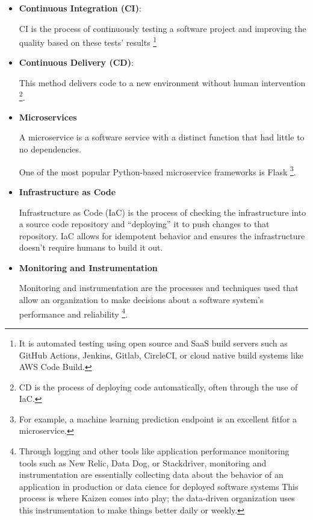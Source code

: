 \begin{itemize}
    \item \textbf{Continuous Integration (CI)}:
    
    \noindent 
    CI is the process of continuously testing a software project and improving the
    quality based on these tests' results
    \footnote{
        It is automated testing using open source and SaaS build
        servers such as GitHub Actions, Jenkins, Gitlab, CircleCI,
        or cloud native build systems like AWS Code Build.
    }


    \item \textbf{Continuous Delivery (CD)}:
    
    \noindent 
    This method delivers code to a new environment without human
    intervention
    \footnote{
        CD is the process of deploying code automatically, often
        through the use of IaC.
    }.
    

    \item \textbf{Microservices}

    \noindent
    A microservice is a software service with a distinct function
    that had little to no dependencies.

    One of the most popular Python-based microservice frameworks is
    Flask
    \footnote{
        For example, a machine learning prediction endpoint is
        an excellent fitfor a microservice.
    }.


    \item \textbf{Infrastructure as Code}
    
    \noindent
    Infrastructure as Code (IaC) is the process of checking the
    infrastructure into a source code repository and “deploying”
    it to push changes to that repository. IaC allows for
    idempotent behavior and ensures the infrastructure doesn't
    require humans to build it out.


    \item \textbf{Monitoring and Instrumentation}
    
    \noindent
    Monitoring and instrumentation are the processes and techniques
    used that allow an organization to make decisions about a
    software system's performance and reliability
    \footnote{
        Through logging and other tools like application
        performance monitoring tools such as New Relic,
        Data Dog, or Stackdriver, monitoring and instrumentation
        are essentially collecting data about the behavior of an
        application in production or data  cience for deployed
        software systems This process is where Kaizen comes into
        play; the data-driven organization uses this
        instrumentation to make things better daily or weekly.
    }.
    


\end{itemize}
